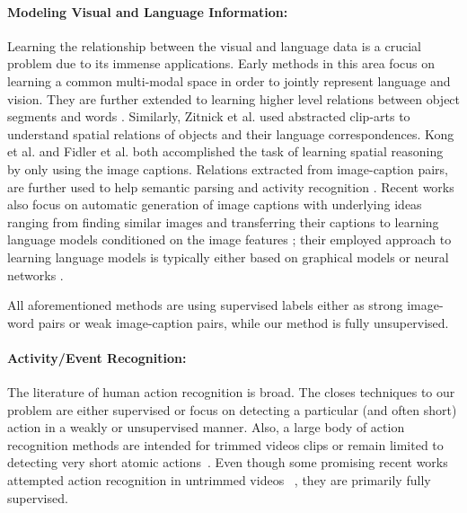 \paragraph{Modeling Visual and Language Information:}
Learning the relationship between the visual and language data is a crucial problem due to its immense applications. Early methods \cite{matching} in this area focus on learning a common multi-modal space in order to jointly represent language and vision. They are further extended to learning higher level relations between object segments and words \cite{connecting}. Similarly, Zitnick et al.\cite{zitnick2013learning,zitnick2013bringing} used abstracted clip-arts to understand spatial relations of objects and their language correspondences. Kong et al. \cite{kong2014you} and Fidler et al. \cite{fidler2013sentence} both accomplished the task of learning spatial reasoning by only using the image captions. Relations extracted from image-caption pairs, are further used to help semantic parsing \cite{yu2013grounded} and activity recognition \cite{motwani2012improving}. Recent works also focus on automatic generation of image captions with underlying ideas ranging from finding similar images and transferring their captions \cite{ordonez2011im2text} to learning language models conditioned on the image features \cite{kiros2014multimodal,socher2014grounded,farhadi2010every}; their employed approach to learning language models is typically either based on graphical models \cite{farhadi2010every} or neural networks \cite{socher2014grounded,kiros2014multimodal,deepAlignment}.

All aforementioned methods are using supervised labels either as strong image-word pairs or weak image-caption pairs, while our method is fully unsupervised.

\paragraph{Activity/Event Recognition:}
The literature of human action recognition is broad. The closes techniques to our problem are either supervised or focus on detecting a particular (and often short) action in a weakly or unsupervised manner. Also, a large body of action recognition methods are intended for trimmed videos clips or remain limited to detecting very short atomic actions~\cite{kuehne2011hmdb, UCF101, niebles10_eccv, laptev08_cvpr, efros03_iccv, ryoo09_iccv}. Even though some promising recent works attempted action recognition in untrimmed videos ~\cite{THUMOS14, oneata2014lear, jainuniversity}, they are primarily fully supervised. 

